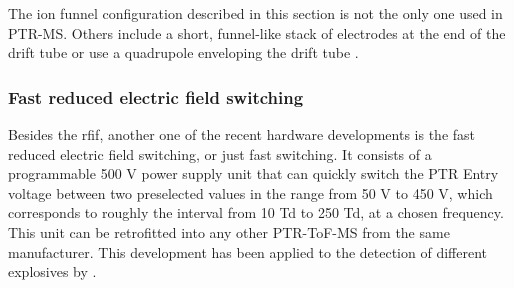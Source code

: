 The ion funnel configuration described in this section is not the only one used in PTR-MS.
%
Others include a short, funnel-like stack of electrodes at the end of the drift tube
or 
use a quadrupole enveloping the drift tube
\cite{piel2019airborne,krechmer2018evaluation}.





\subsubsection{Fast reduced electric field  switching}\label{section:fs}
Besides the \acrshort{rfif}, another one of the recent hardware developments %
is the fast reduced electric field switching, or just fast switching.
%
It consists of a programmable 500 V power supply unit that can quickly switch the PTR Entry voltage between two preselected values in the range from 50 V to 450 V, which corresponds  to roughly the interval from 10 Td to 250 Td, at a chosen frequency.  This unit can be retrofitted into any other PTR-ToF-MS  from the same manufacturer.
This development has been applied to the detection of different explosives by \citeauthor{doi:10.1021/acs.analchem.7b05211} \cite{doi:10.1021/acs.analchem.7b05211}.


